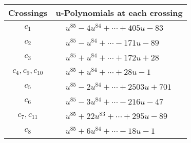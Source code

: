 \documentclass[1p]{elsarticle_modified}
\theoremstyle{definition}
\begin{document}
\begin{tabular}{m{50pt}|m{274pt}}
Crossings & \hspace{64pt}u-Polynomials at each crossing \\
\hline $$\begin{aligned}c_{1}\end{aligned}$$&$\begin{aligned}
&u^{85}-4 u^{84}+\cdots+405 u-83
\end{aligned}$\\
\hline $$\begin{aligned}c_{2}\end{aligned}$$&$\begin{aligned}
&u^{85}- u^{84}+\cdots-171 u-89
\end{aligned}$\\
\hline $$\begin{aligned}c_{3}\end{aligned}$$&$\begin{aligned}
&u^{85}+u^{84}+\cdots+172 u+28
\end{aligned}$\\
\hline $$\begin{aligned}c_{4},c_{9},c_{10}\end{aligned}$$&$\begin{aligned}
&u^{85}+u^{84}+\cdots+28 u-1
\end{aligned}$\\
\hline $$\begin{aligned}c_{5}\end{aligned}$$&$\begin{aligned}
&u^{85}-2 u^{84}+\cdots+2503 u+701
\end{aligned}$\\
\hline $$\begin{aligned}c_{6}\end{aligned}$$&$\begin{aligned}
&u^{85}-3 u^{84}+\cdots-216 u-47
\end{aligned}$\\
\hline $$\begin{aligned}c_{7},c_{11}\end{aligned}$$&$\begin{aligned}
&u^{85}+22 u^{83}+\cdots+295 u-89
\end{aligned}$\\
\hline $$\begin{aligned}c_{8}\end{aligned}$$&$\begin{aligned}
&u^{85}+6 u^{84}+\cdots-18 u-1
\end{aligned}$\\
\hline
\end{tabular}\\~\\
\end{document}
